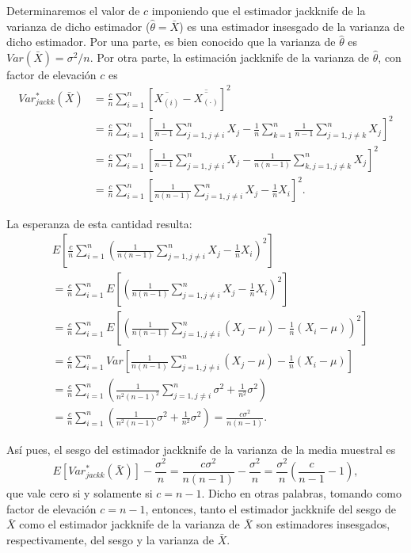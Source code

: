\documentclass[
]{book}
\theoremstyle{break}
\theoremstyle{nonumberplain}
\begin{document}
Determinaremos el valor de \(c\) imponiendo que el estimador jackknife de la varianza de dicho estimador (\(\hat{\theta}=\bar{X}\)) es una estimador insesgado de la varianza de dicho estimador.
Por una parte, es bien conocido que la varianza de \(\hat{\theta}\) es \(Var\left( \bar{X} \right) = \sigma^2 /n\).
Por otra parte, la estimación jackknife de la varianza de \(\hat{\theta}\), con factor de elevación \(c\) es
\[\begin{aligned}
Var_{jackk}^{\ast}\left( \bar{X} \right) 
&= \frac{c}{n}\sum_{i=1}^{n}\left[ \overline{X_{(i)}}
-\overline{\overline{X_{\left( \cdot \right)}}}\right]^2 \\
&= \frac{c}{n}\sum_{i=1}^{n}\left[ \frac{1}{n-1}\sum_{j=1,j\neq i}^{n}X_j
- \frac{1}{n}\sum_{k=1}^{n}\frac{1}{n-1}\sum_{j=1,j\neq k}^{n}X_j\right]^2 \\
&= \frac{c}{n}\sum_{i=1}^{n}\left[ \frac{1}{n-1}\sum_{j=1,j\neq i}^{n}X_j
- \frac{1}{n\left( n-1 \right)}\sum_{k,j=1,j\neq k}^{n}X_j\right]^2 \\
&= \frac{c}{n}\sum_{i=1}^{n}\left[ \frac{1}{n\left( n-1 \right)}
\sum_{j=1,j\neq i}^{n}X_j-\frac{1}{n}X_i\right]^2.
\end{aligned}\]

La esperanza de esta cantidad resulta:
\[\begin{aligned}
&E\left[ \frac{c}{n}\sum_{i=1}^{n}\left( \frac{1}{n\left( n-1 \right)}
\sum_{j=1,j\neq i}^{n}X_j-\frac{1}{n}X_i \right)^2\right] \\
&= \frac{c}{n}\sum_{i=1}^{n}E\left[ \left( \frac{1}{n\left( n-1 \right)}
\sum_{j=1,j\neq i}^{n}X_j-\frac{1}{n}X_i \right)^2\right] \\
&= \frac{c}{n}\sum_{i=1}^{n}E\left[ \left( \frac{1}{n\left( n-1 \right)}
\sum_{j=1,j\neq i}^{n}\left( X_j-\mu \right) 
-\frac{1}{n}\left( X_i-\mu \right) \right)^2\right] \\
&= \frac{c}{n}\sum_{i=1}^{n}Var\left[ \frac{1}{n\left( n-1 \right)}
\sum_{j=1,j\neq i}^{n}\left( X_j-\mu \right) 
-\frac{1}{n}\left( X_i-\mu \right) \right]\\
&= \frac{c}{n}\sum_{i=1}^{n}\left( \frac{1}{n^2\left( n-1 \right)^2}
\sum_{j=1,j\neq i}^{n}\sigma^2+\frac{1}{n^2}\sigma^2 \right) \\
&= \frac{c}{n}\sum_{i=1}^{n}\left( \frac{1}{n^2\left( n-1 \right)}\sigma^2+\frac{1}{n^2}\sigma^2 \right) 
=\frac{c\sigma^2}{n\left(n-1 \right)}.
\end{aligned}\]

Así pues, el sesgo del estimador jackknife de la varianza de la media
muestral es
\[E\left[ Var_{jackk}^{\ast}\left( \bar{X} \right) \right] -\frac{\sigma^2}{n}
= \frac{c\sigma^2}{n\left( n-1 \right)} - \frac{\sigma^2}{n}
= \frac{\sigma^2}{n}\left( \frac{c}{n-1} - 1 \right),\]
que vale cero si y solamente si \(c=n-1\).
Dicho en otras palabras, tomando como factor de
elevación \(c=n-1\), entonces, tanto el estimador jackknife del sesgo de
\(\bar{X}\) como el estimador jackknife de la varianza de
\(\bar{X}\) son estimadores insesgados, respectivamente, del sesgo y
la varianza de \(\bar{X}\).
\end{document}
